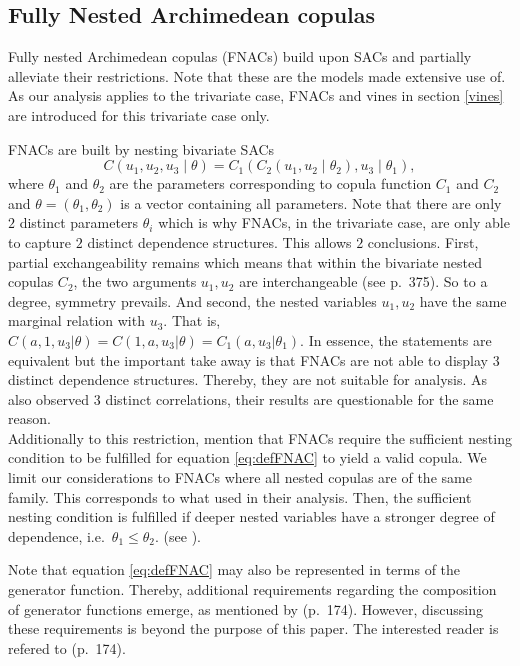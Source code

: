 \documentclass[
]{krantz}
\begin{document}
\subsection{Fully Nested Archimedean copulas}\label{nacs}

Fully nested Archimedean copulas (FNACs) build upon SACs
and partially alleviate their restrictions.
Note that these are the models \citet{grimaldi2006} made extensive use of.\\
As our analysis applies to the trivariate case, FNACs and vines in section \ref{vines} are introduced
for this trivariate case only.

FNACs are built by nesting bivariate SACs
\[
C(u_1, u_2, u_3 \mid \theta) = C_1\left( C_2(u_1, u_2 \mid \theta_2), u_3 \mid \theta_1 \right),
\label{eq:defFNAC} 
\]
where \(\theta_1\) and \(\theta_2\) are the parameters corresponding to copula function \(C_1\) and \(C_2\) and
\(\theta = (\theta_1, \theta_{2})\) is a vector containing all parameters.
Note that there are only \(2\) distinct parameters \(\theta_i\) which is why FNACs, in the trivariate
case, are only able to capture \(2\) distinct dependence structures.
This allows \(2\) conclusions. First, partial exchangeability remains which means that
within the bivariate nested copulas \(C_2\), the two arguments \(u_1, u_2\) are
interchangeable (see \citet{embrecht2003} p.~375). So to a degree, symmetry
prevails.
And second, the nested variables \(u_1, u_2\) have the same marginal relation with \(u_3\).
That is, \(C(a, 1, u_3|\theta) = C(1, a, u_3 | \theta) = C_1(a, u_3|\theta_1)\).
In essence, the statements are equivalent but the important take away is that FNACs are not
able to display \(3\) distinct dependence structures. Thereby, they are not suitable for analysis.
As also \citet{grimaldi2006} observed \(3\) distinct correlations, their results are questionable for the same reason.\\
Additionally to this restriction, \citet{hofert2016} mention that FNACs
require the sufficient nesting condition to be fulfilled for equation \eqref{eq:defFNAC} to yield a valid copula.
We limit our considerations to FNACs where all nested copulas are of the same family.
This corresponds to what \citet{grimaldi2006} used in their analysis.
Then, the sufficient nesting condition is fulfilled if
deeper nested variables have a stronger degree of dependence, i.e.~\(\theta_1 \leq \theta_{2}\).
(see \citet{grimaldi2006}).

Note that equation \eqref{eq:defFNAC} may also be represented in terms of the generator function. Thereby, additional requirements
regarding the composition of generator functions emerge, as mentioned by \citet{zhang2019} (p.~174).
However, discussing these requirements is beyond the purpose of this paper. The interested reader is refered to \citet{zhang2019} (p.~174).
\end{document}
